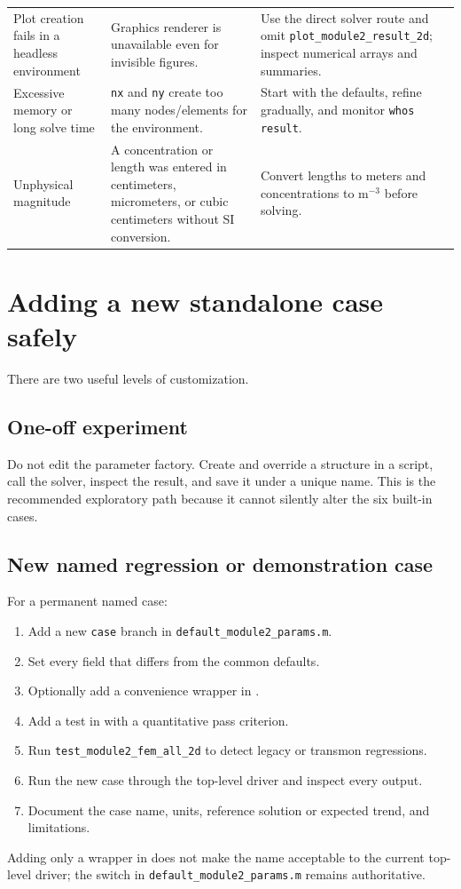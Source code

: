 \documentclass[11pt]{article}
\newcommand{\matlabfile}[1]{\path{#1}}
\begin{document}
\begin{longtable}{p{} p{} p{}}
Plot creation fails in a headless environment & Graphics renderer is unavailable even for invisible figures. & Use the direct solver route and omit \texttt{plot\_module2\_result\_2d}; inspect numerical arrays and summaries. \\
Excessive memory or long solve time & \texttt{nx} and \texttt{ny} create too many nodes/elements for the environment. & Start with the defaults, refine gradually, and monitor \texttt{whos result}. \\
Unphysical magnitude & A concentration or length was entered in centimeters, micrometers, or cubic centimeters without SI conversion. & Convert lengths to meters and concentrations to m$^{-3}$ before solving. \\
\bottomrule
\end{longtable}

\section{Adding a new standalone case safely}

There are two useful levels of customization.

\subsection{One-off experiment}

Do not edit the parameter factory. Create and override a structure in a script, call the solver, inspect the result, and save it under a unique name. This is the recommended exploratory path because it cannot silently alter the six built-in cases.

\subsection{New named regression or demonstration case}

For a permanent named case:
\begin{enumerate}[leftmargin=*]
  \item Add a new \texttt{case} branch in \texttt{default\_module2\_params.m}.
  \item Set every field that differs from the common defaults.
  \item Optionally add a convenience wrapper in \matlabfile{matlab/cases/}.
  \item Add a test in \matlabfile{matlab/tests/} with a quantitative pass criterion.
  \item Run \texttt{test\_module2\_fem\_all\_2d} to detect legacy or transmon regressions.
  \item Run the new case through the top-level driver and inspect every output.
  \item Document the case name, units, reference solution or expected trend, and limitations.
\end{enumerate}
Adding only a wrapper in \matlabfile{matlab/cases/} does not make the name acceptable to the current top-level driver; the switch in \texttt{default\_module2\_params.m} remains authoritative.
\end{document}
